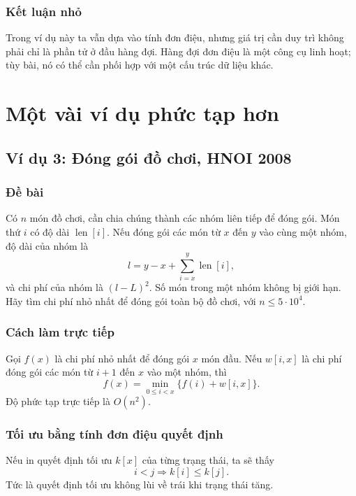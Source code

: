 \documentclass[11pt]{article}
\begin{document}
\subsubsection*{Kết luận nhỏ}

Trong ví dụ này ta vẫn dựa vào tính đơn điệu, nhưng giá trị cần duy trì không
phải chỉ là phần tử ở đầu hàng đợi. Hàng đợi đơn điệu là một công cụ linh
hoạt; tùy bài, nó có thể cần phối hợp với một cấu trúc dữ liệu khác.

\section{Một vài ví dụ phức tạp hơn}

\subsection{Ví dụ 3: Đóng gói đồ chơi, HNOI 2008}

\subsubsection*{Đề bài}

Có $n$ món đồ chơi, cần chia chúng thành các nhóm liên tiếp để đóng gói. Món
thứ $i$ có độ dài $\operatorname{len}[i]$. Nếu đóng gói các món từ $x$ đến
$y$ vào cùng một nhóm, độ dài của nhóm là
\[
  l=y-x+\sum_{i=x}^{y}\operatorname{len}[i],
\]
và chi phí của nhóm là $(l-L)^2$. Số món trong một nhóm không bị giới hạn.
Hãy tìm chi phí nhỏ nhất để đóng gói toàn bộ đồ chơi, với
$n\le 5\cdot 10^4$.

\subsubsection*{Cách làm trực tiếp}

Gọi $f(x)$ là chi phí nhỏ nhất để đóng gói $x$ món đầu. Nếu
$w[i,x]$ là chi phí đóng gói các món từ $i+1$ đến $x$ vào một nhóm, thì
\[
  f(x)=\min_{0\le i<x}\{f(i)+w[i,x]\}.
\]
Độ phức tạp trực tiếp là $O(n^2)$.

\subsubsection*{Tối ưu bằng tính đơn điệu quyết định}

Nếu in quyết định tối ưu $k[x]$ của từng trạng thái, ta sẽ thấy
\[
  i<j \Longrightarrow k[i]\le k[j].
\]
Tức là quyết định tối ưu không lùi về trái khi trạng thái tăng.
\end{document}
